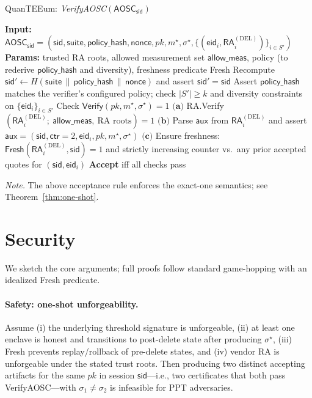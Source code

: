 \documentclass[runningheads,orivec]{llncs}
\newcommand{\prot}{\textsf{QuanTEEum}}
\newcommand{\sid}{\mathsf{sid}}
\begin{document}
\begin{algorithm}[H]
\caption{\prot{}: \emph{VerifyAOSC}$(\mathsf{AOSC}_\sid)$}
\label{alg:verify-aosc}
\begin{small}
\begin{algorithmic}[1]
\State \textbf{Input:} $\mathsf{AOSC}_\sid = (\sid,\mathsf{suite},\mathsf{policy\_hash},\mathsf{nonce},pk,m^{\star},\sigma^{\star},\{(\mathsf{eid}_i,\mathsf{RA}^{(\mathrm{DEL})}_i)\}_{i\in S'})$
\State \textbf{Params:} trusted RA roots, allowed measurement set $\textsf{allow\_meas}$, policy (to rederive $\mathsf{policy\_hash}$ and diversity), freshness predicate \textsf{Fresh}
\State Recompute $\sid' \gets H(\mathsf{suite}\,\|\,\mathsf{policy\_hash}\,\|\,\mathsf{nonce})$ and assert $\sid'=\sid$
\State Assert $\mathsf{policy\_hash}$ matches the verifier’s configured policy; check $|S'|\ge k$ and diversity constraints on $\{\mathsf{eid}_i\}_{i\in S'}$
\State Check $\mathsf{Verify}(pk,m^{\star},\sigma^{\star})=1$
  \State $\textbf{(a)}$ \textsf{RA.Verify}$(\mathsf{RA}^{(\mathrm{DEL})}_i;\ \textsf{allow\_meas},\ \text{RA roots})=1$
  \State $\textbf{(b)}$ Parse $\mathsf{aux}$ from $\mathsf{RA}^{(\mathrm{DEL})}_i$ and assert $\mathsf{aux}=(\sid,\mathsf{ctr}{=}2,\mathsf{eid}_i,pk,m^{\star},\sigma^{\star})$
  \State $\textbf{(c)}$ Ensure freshness: $\textsf{Fresh}(\mathsf{RA}^{(\mathrm{DEL})}_i,\sid)=1$ and strictly increasing counter vs.\ any prior accepted quotes for $(\sid,\mathsf{eid}_i)$
\EndFor
\State \textbf{Accept} iff all checks pass
\end{algorithmic}
\end{small}
\end{algorithm}

\FloatBarrier

\noindent\emph{Note.} The above acceptance rule enforces the exact-one semantics; see Theorem~\ref{thm:one-shot}.

\section{Security}\label{sec:security}
We sketch the core arguments; full proofs follow standard game-hopping with an idealized \textsf{Fresh} predicate.
\paragraph{Safety: one-shot unforgeability.}
\begin{theorem}\label{thm:one-shot}
Assume (i) the underlying threshold signature is unforgeable, (ii) at least one enclave is honest and transitions to post-delete state after producing $\sigma^{\star}$, (iii) \textsf{Fresh} prevents replay/rollback of pre-delete states, and (iv) vendor RA is unforgeable under the stated trust roots. Then producing two distinct accepting artifacts for the same $pk$ in session $\mathsf{sid}$—i.e., two certificates that both pass \textsf{VerifyAOSC}—with $\sigma_1 \neq \sigma_2$ is infeasible for PPT adversaries.
\end{theorem}
\end{document}

